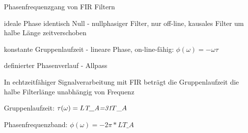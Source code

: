 \documentclass[a4paper]{article}
\begin{document}
\begin{multicols}{3}
  Phasenfrequenzgang von FIR Filtern
  \begin{itemize*}
    \item ideale Phase identisch Null - nullphasiger Filter, nur off-line, kausales Filter um halbe Länge zeitverschoben
    \item konstante Gruppenlaufzeit - lineare Phase, on-line-fähig: $\phi(\omega)=-\omega\tau$
    \item definierter Phasenverlauf - Allpass
    \item In echtzeitfähiger Signalverarbeitung mit FIR beträgt die Gruppenlaufzeit die halbe Filterlänge unabhängig von Frequenz%
    \item Gruppenlaufzeit: $\tau(\omega)=L\emph{T\_A=31}T\_A$
    \item Phasenfrequenzband: $\phi(\omega)=-2\pi*LT\_A$
  \end{itemize*}


\end{multicols}
\end{document}
